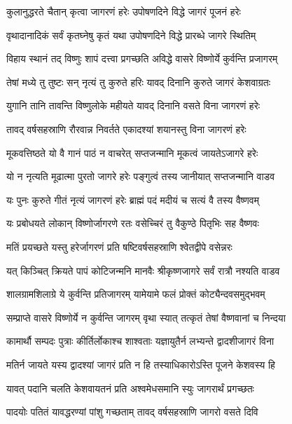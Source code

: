 \twolineshloka
{कुलानुद्धरते चैतान् कृत्वा जागरणं हरेः}
{उपोषणदिने विद्धे जागरं पूजनं हरेः}%

\twolineshloka
{वृथादानादिकं सर्वं कृतघ्नेषु कृतं यथा}
{उपोषणदिने विद्धे प्रारब्धे जागरे स्थितिम्}%

\twolineshloka
{विहाय स्थानं तद् विष्णुः शापं दत्त्वा प्रगच्छति}
{अविद्धे वासरे विष्णोर्ये कुर्वन्ति प्रजागरम्}%

\twolineshloka
{तेषां मध्ये तु तुष्टः सन् नृत्यं तु कुरुते हरिः}
{यावद् दिनानि कुरुते जागरं केशवाग्रतः}%

\twolineshloka
{युगानि तानि तावन्ति विष्णुलोके महीयते}
{यावद् दिनानि वसते विना जागरणं हरेः}%

\twolineshloka
{तावद् वर्षसहस्राणि रौरवान्न निवर्तते}
{एकादश्यां शयानस्तु विना जागरणं हरेः}%

\twolineshloka
{मूकवत्तिष्ठते यो वै गानं पाठं न वाचरेत्}
{सप्तजन्मानि मूकत्वं जायतेऽजागरे हरेः}%

\twolineshloka
{यो न नृत्यति मूढात्मा पुरतो जागरे हरेः}
{पङ्गुत्वं तस्य जानीयात् सप्तजन्मानि वाडव}%

\twolineshloka
{यः पुनः कुरुते गीतं नृत्यं जागरणं हरेः}
{ब्राह्मं पदं मदीयं च सत्यं वै तस्य वैष्णवम्}%

\twolineshloka
{यः प्रबोधयते लोकान् विष्णोर्जागरणे रतः}
{वसेच्चिरं तु वैकुण्ठे पितृभिः सह वैष्णवः}%

\twolineshloka
{मतिं प्रयच्छते यस्तु हरेर्जागरणं प्रति}
{षष्टिवर्षसहस्राणि श्वेतद्वीपे वसेन्नरः}%

\twolineshloka
{यत् किञ्चित् क्रियते पापं कोटिजन्मनि मानवैः}
{श्रीकृष्णजागरे सर्वं रात्रौ नश्यति वाडव}%

\twolineshloka
{शालग्रामशिलाग्रे ये कुर्वन्ति प्रतिजागरम्}
{यामेयामे फलं प्रोक्तं कोट्यैन्दवसमुद्भवम्}%

\twolineshloka
{सम्प्राप्ते वासरे विष्णोर्ये न कुर्वन्ति जागरम्}
{वृथा स्यात् तत्कृतं तेषां वैष्णवानां च निन्दया}%

\twolineshloka
{कामार्थौ सम्पदः पुत्राः कीर्तिर्लोकाश्च शाश्वताः}
{यज्ञायुतैर्न लभ्यन्ते द्वादशीजागरं विना}%

\twolineshloka
{मतिर्न जायते यस्य द्वादश्यां जागरं प्रति}
{न हि तस्याधिकारोऽस्ति पूजने केशवस्य हि}%

\twolineshloka
{यावत् पदानि चलति केशवायतनं प्रति}
{अश्वमेधसमानि स्युः जागरार्थं प्रगच्छतः}%

\twolineshloka
{पादयोः पतितं यावद्धरण्यां पांशु गच्छताम्}
{तावद् वर्षसहस्राणि जागरो वसते दिवि}%

